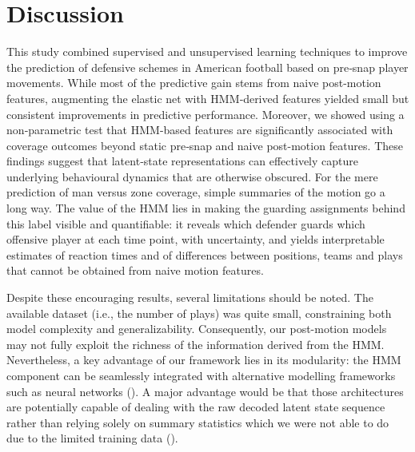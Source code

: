 \documentclass[namedate,webpdf,modern,medium]{oup-authoring-template}
\begin{document}

\section{Discussion}\label{sec:discussion}

This study combined supervised and unsupervised learning techniques to improve the prediction of defensive schemes in American football based on pre‑snap player movements. While most of the predictive gain stems from naive post-motion features, augmenting the elastic net with HMM‑derived features yielded small but consistent improvements in predictive performance. Moreover, we showed using a non‑parametric test that HMM-based features are significantly associated with coverage outcomes beyond static pre‑snap and naive post-motion features. These findings suggest that latent‑state representations can effectively capture underlying behavioural dynamics that are otherwise obscured. For the mere prediction of man versus zone coverage, simple summaries of the motion go a long way. The value of the HMM lies in making the guarding assignments behind this label visible and quantifiable: it reveals which defender guards which offensive player at each time point, with uncertainty, and yields interpretable estimates of reaction times and of differences between positions, teams and plays that cannot be obtained from naive motion features.

Despite these encouraging results, several limitations should be noted. The available dataset (i.e., the number of plays) was quite small, constraining both model complexity and generalizability. Consequently, our post-motion models may not fully exploit the richness of the information derived from the HMM. Nevertheless, a key advantage of our framework lies in its modularity: the HMM component can be seamlessly integrated with alternative modelling frameworks such as neural networks (\citealp{Song2023}). A major advantage would be that those architectures are potentially capable of dealing with the raw decoded latent state sequence rather than relying solely on summary statistics which we were not able to do due to the limited training data (\citealp{dempster2020rocket}). 
\end{document}
